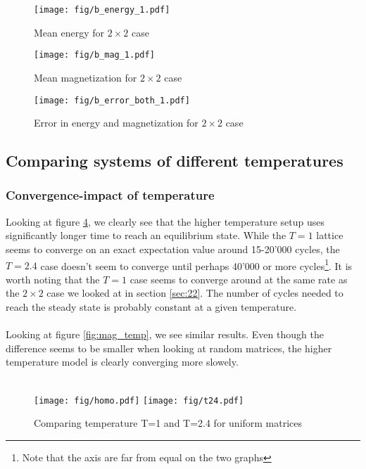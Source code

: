 \documentclass[10pt,a4paper]{article}
\begin{document}
\begin{figure}[H]
\centering
\texttt{[image: fig/b\_energy\_1.pdf]}
\caption{Mean energy for $2\times 2$ case}
\label{fig:mean_energy}
\end{figure}

\begin{figure}[H]
\centering
\texttt{[image: fig/b\_mag\_1.pdf]}
\caption{Mean magnetization for $2\times 2$ case}
\label{fig:mean_mag}
\end{figure}

\begin{figure}[H]
\centering
\texttt{[image: fig/b\_error\_both\_1.pdf]}
\caption{Error in energy and magnetization for $2\times 2$ case}
\label{fig:error_2}
\end{figure}


\subsection{Comparing systems of different temperatures}\label{sec:temp}
\subsubsection{Convergence-impact of temperature}
Looking at figure \ref{fig:energy_temp}, we clearly see that the higher temperature setup uses significantly longer time to reach an equilibrium state. While the $T=1$ lattice seems to converge on an exact expectation value around 15-20'000 cycles, the $T=2.4$ case doesn't seem to converge until perhaps 40'000 or more cycles\footnote{Note that the axis are far from equal on the two graphs}. It is worth noting that the $T=1$ case seems to converge around at the same rate as the $2\times 2$ case we looked at in section \ref{sec:22}. The number of cycles needed to reach the steady state is probably constant at a given temperature.\\\\
Looking at figure \ref{fig:mag_temp}, we see similar results. Even though the difference seems to be smaller when looking at random matrices, the higher temperature model is clearly converging more slowely.\\\\


\begin{figure}[H]
\texttt{[image: fig/homo.pdf]}
\texttt{[image: fig/t24.pdf]}
\caption{Comparing temperature T=1 and T=2.4 for uniform matrices}
\label{fig:energy_temp}
\end{figure}
\end{document}
